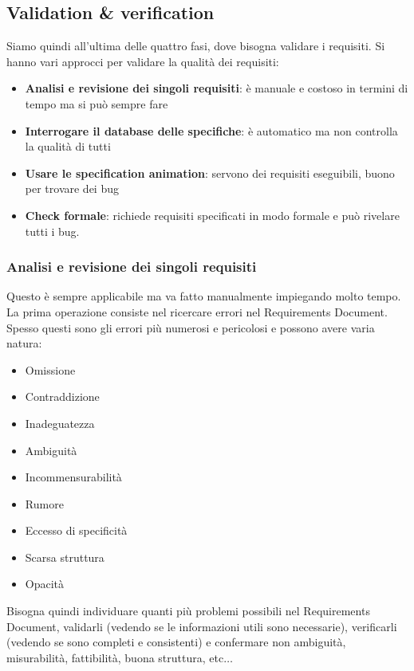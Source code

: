 \subsection{Validation \& verification}
Siamo quindi all'ultima delle quattro fasi, dove bisogna validare i requisiti.
Si hanno vari approcci per validare la qualità dei requisiti:
\begin{itemize}
      \item \textbf{Analisi e revisione dei singoli requisiti}: è manuale e costoso in
            termini di tempo ma si può sempre fare
      \item \textbf{Interrogare il database delle specifiche}: è automatico ma non
            controlla la qualità di tutti
      \item \textbf{Usare le specification animation}: servono dei requisiti eseguibili,
            buono per trovare dei bug
      \item \textbf{Check formale}: richiede requisiti specificati in modo
            formale e può rivelare tutti i bug.
\end{itemize}

\subsubsection{Analisi e revisione dei singoli requisiti}
Questo è sempre applicabile ma va fatto manualmente impiegando molto tempo. La
prima operazione consiste nel ricercare errori nel Requirements Document. Spesso
questi sono gli errori più numerosi e pericolosi e possono avere varia natura:
\begin{itemize}
      \item Omissione
      \item Contraddizione
      \item Inadeguatezza
      \item Ambiguità
      \item Incommensurabilità
      \item Rumore
      \item Eccesso di specificità
      \item Scarsa struttura
      \item Opacità
\end{itemize}
Bisogna quindi individuare quanti più problemi possibili nel Requirements Document,
validarli (vedendo se le informazioni utili sono necessarie), verificarli (vedendo
se sono completi e consistenti) e confermare non ambiguità, misurabilità,
fattibilità, buona struttura, etc$\dots$

